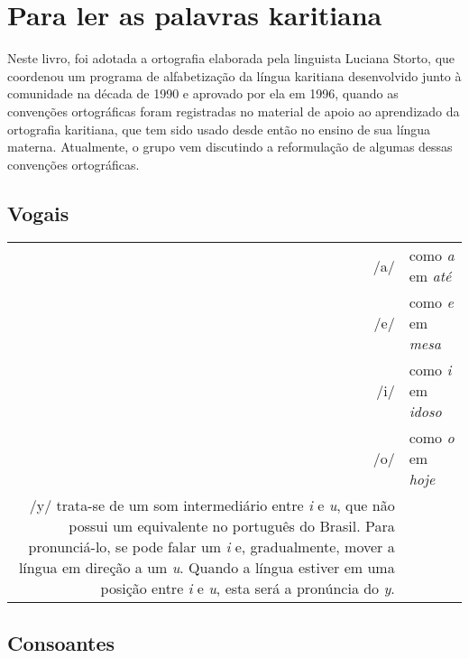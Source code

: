 \chapter{Para ler as palavras karitiana}

Neste livro, foi adotada a ortografia elaborada pela linguista Luciana
Storto, que coordenou um programa de alfabetização da língua karitiana
desenvolvido junto à comunidade na década de 1990 e aprovado por ela em
1996, quando as convenções ortográficas foram registradas no material de
apoio ao aprendizado da ortografia karitiana, que tem sido usado desde
então no ensino de sua língua materna. Atualmente, o grupo vem
discutindo a reformulação de algumas dessas convenções ortográficas.

\section{Vogais}

\begingroup
\begin{tabular}{rl}
/a/ & como \textit{a} em \textit{até}\\
/e/ & como \textit{e} em \textit{mesa}\\
/i/ & como \textit{i} em \textit{idoso}\\
/o/ & como \textit{o} em \textit{hoje}\\
/y/ trata-se de um som intermediário entre \textit{i} e \textit{u}, que não possui um
equivalente no português do Brasil. Para pronunciá-lo, se pode falar um
\textit{i} e, gradualmente, mover a língua em direção a um \textit{u}. Quando a
língua estiver em uma posição entre \textit{i} e \textit{u}, esta será a pronúncia
do \textit{y}.\\
\end{tabular}
\endgroup

\section{Consoantes}

